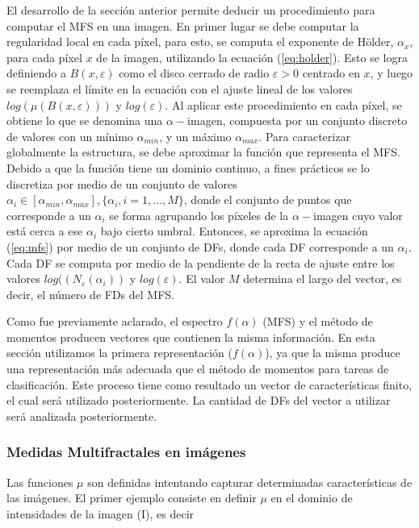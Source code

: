 El desarrollo de la sección anterior permite deducir un procedimiento para computar el MFS en una imagen.
En primer lugar se debe computar la regularidad local en cada píxel, para esto, se computa el exponente de H\"older, $\alpha_{x}$, para cada píxel $x$ de la imagen, utilizando la ecuación (\ref{eq:holder}).
Esto se logra definiendo a $B(x,\varepsilon)$ como el disco cerrado de radio $\varepsilon > 0$ centrado en $x$, y luego se reemplaza el límite en la ecuación con el ajuste lineal de los valores $log(\mu(B(x,\varepsilon)))$ y $log(\varepsilon)$.
Al aplicar este procedimiento en cada píxel, se obtiene lo que se denomina una $\alpha-$imagen, compuesta por un conjunto discreto de valores con un mínimo $\alpha_{min}$, y un máximo $\alpha_{max}$.
Para caracterizar globalmente la estructura, se debe aproximar la función que representa el MFS.
Debido a que la función tiene un dominio continuo, a fines prácticos se lo discretiza por medio de un conjunto de valores $\alpha_{i} \in [\alpha_{min},\alpha_{max}], \{\alpha_{i}, i = 1,\dots,M\}$, donde el conjunto de puntos que corresponde a un $\alpha_{i}$ se forma agrupando los píxeles de la $\alpha-$imagen cuyo valor está cerca a ese $\alpha_{i}$ bajo cierto umbral. 
Entonces, se aproxima la ecuación (\ref{eq:mfs}) por medio de un conjunto de DFs, donde cada DF corresponde a un $\alpha_{i}$.
Cada DF se computa por medio de la pendiente de la recta de ajuste entre los valores $log((N_{\varepsilon}(\alpha_{i}))$ y $log(\varepsilon)$. 
El valor $M$ determina el largo del vector, es decir, el número de FDs del MFS.

Como fue previamente aclarado, el espectro $f(\alpha)$ (MFS) y el método de momentos producen vectores que contienen la misma información.
En esta sección utilizamos la primera representación ($f(\alpha)$), ya que la misma produce una representación más adecuada que el método de momentos para tareas de clasificación.
Este proceso tiene como resultado un vector de características finito, el cual será utilizado posteriormente.
La cantidad de DFs del vector a utilizar será analizada posteriormente.


\subsubsection{Medidas Multifractales en imágenes}
\label{sec:mfsmeasures}
Las funciones $\mu$ son definidas intentando capturar determinadas características de las imágenes.
El primer ejemplo consiste en definir $\mu$ en el dominio de intensidades de la imagen (I), es decir

